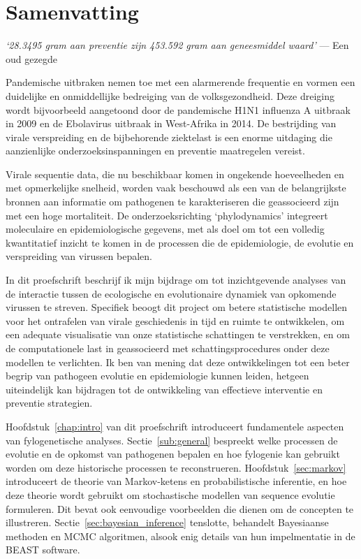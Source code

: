 
\chapter*{Samenvatting}

\bigskip{}

\emph{`28.3495 gram aan preventie zijn 453.592 gram aan geneesmiddel waard'}
--- Een oud gezegde

\bigskip{}

Pandemische uitbraken nemen toe met een alarmerende frequentie en vormen een duidelijke en onmiddellijke bedreiging van de volksgezondheid.
Deze dreiging wordt bijvoorbeeld aangetoond door de pandemische H1N1 influenza A uitbraak in 2009 en de Ebolavirus uitbraak in West-Afrika in 2014.
De bestrijding van virale verspreiding en de bijbehorende ziektelast is een enorme uitdaging die aanzienlijke onderzoeksinspanningen en preventie maatregelen vereist.

Virale sequentie data, die nu beschikbaar komen in ongekende hoeveelheden en met opmerkelijke snelheid, worden vaak beschouwd als een van de belangrijkste bronnen aan informatie om pathogenen te karakteriseren die geassocieerd zijn met een hoge mortaliteit.
De onderzoeksrichting `phylodynamics' integreert moleculaire en epidemiologische gegevens, met als doel om tot een volledig kwantitatief inzicht te komen in de processen die de epidemiologie, de evolutie en verspreiding van virussen bepalen.

In dit proefschrift beschrijf ik mijn bijdrage om tot inzichtgevende analyses van de interactie tussen de ecologische en evolutionaire dynamiek van opkomende virussen te streven.
Specifiek beoogt dit project om betere statistische modellen voor het ontrafelen van virale geschiedenis in tijd en ruimte te ontwikkelen, om een adequate visualisatie van onze statistische schattingen te verstrekken, en om de computationele last in geassocieerd met schattingsprocedures onder deze modellen te verlichten.
Ik ben van mening dat deze ontwikkelingen tot een beter begrip van pathogeen evolutie en epidemiologie kunnen leiden, hetgeen uiteindelijk kan bijdragen tot de ontwikkeling van effectieve interventie en preventie strategien.

Hoofdstuk~\ref {chap:intro} van dit proefschrift introduceert fundamentele aspecten van fylogenetische analyses.
Sectie~\ref{sub:general} bespreekt welke processen de evolutie en de opkomst van pathogenen bepalen en hoe fylogenie kan gebruikt worden om deze historische processen te reconstrueren.
Hoofdstuk~\ref{sec:markov} introduceert de theorie van Markov-ketens en probabilistische inferentie, en hoe deze theorie wordt gebruikt om stochastische modellen van sequence evolutie formuleren.
Dit bevat ook eenvoudige voorbeelden die dienen om de concepten te illustreren.
Sectie~\ref{sec:bayesian_inference} tenslotte, behandelt Bayesiaanse methoden en MCMC algoritmen, alsook enig details van hun impelmentatie in de BEAST software.

